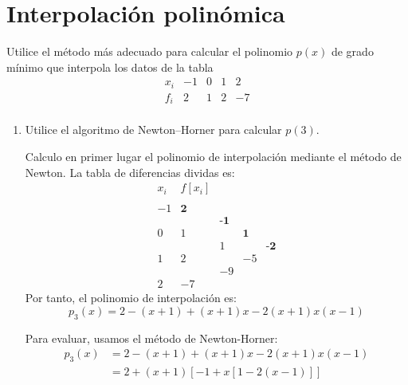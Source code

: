 \section{Interpolación polinómica}

\begin{ejercicio}
    Utilice el método más adecuado para calcular el polinomio $p(x)$ de grado mínimo que interpola los datos de la tabla
    \begin{equation*}
        \begin{array}{c|ccccc}
            x_i & -1 & 0 & 1 & 2 \\ \hline
            f_i & 2 & 1 & 2 & -7 \\
        \end{array}
    \end{equation*}

    \begin{enumerate}
        \item Utilice el algoritmo de Newton–Horner para calcular $p(3)$.

        Calculo en primer lugar el polinomio de interpolación mediante el método de Newton. La tabla de diferencias dividas es:
        \begin{equation*}
            \begin{array}{c|cccc}
                x_i & f[x_i] \\
                \\
                -1 & \textbf{2} \\
                && \textbf{-1}\\
                0 & 1 & & \textbf{1}\\
                && 1 &&\textbf{-2}\\
                1 & 2 && -5\\
                & & -9\\
                2 &-7
            \end{array}
        \end{equation*}
        Por tanto, el polinomio de interpolación es:
        \begin{equation*}
            p_3(x) = 2-(x+1) +(x+1)x -2(x+1)x(x-1)
        \end{equation*}

        Para evaluar, usamos el método de Newton-Horner:
        \begin{equation*}
            \begin{split}
                p_3(x) &= 2-(x+1) +(x+1)x -2(x+1)x(x-1) \\
                &= 2+(x+1)[-1+x[1-2(x-1)]]
            \end{split}
        \end{equation*}


\end{enumerate}
\end{ejercicio}
